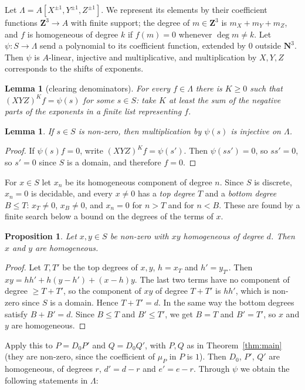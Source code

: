\documentclass[11pt]{amsart}
\newtheorem{proposition}[theorem]{Proposition}
\newtheorem{lemma}[theorem]{Lemma}
\theoremstyle{definition}
\theoremstyle{remark}
\newcommand{\La}{\Lambda}
\newcommand{\N}{\mathbf N}
\newcommand{\Z}{\mathbf Z}
\begin{document}
Let $\La=A[X^{\pm1},Y^{\pm1},Z^{\pm1}]$. We represent its elements by their
coefficient functions $\Z^3\to A$ with finite support; the degree of
$m\in\Z^3$ is $m_X+m_Y+m_Z$, and $f$ is homogeneous of degree $k$ if
$f(m)=0$ whenever $\deg m\ne k$. Let $\psi:S\to\La$ send a polynomial to its
coefficient function, extended by $0$ outside $\N^3$. Then $\psi$ is
$A$-linear, injective and multiplicative, and multiplication by $X,Y,Z$
corresponds to the shifts of exponents.

\begin{lemma}[clearing denominators]\label{lem:shift}
For every $f\in\La$ there is $K\ge0$ such that $(XYZ)^Kf=\psi(s)$ for some
$s\in S$: take $K$ at least the sum of the negative parts of the exponents
in a finite list representing $f$.
\end{lemma}

\begin{lemma}\label{lem:reg}
If $s\in S$ is non-zero, then multiplication by $\psi(s)$ is injective on
$\La$.
\end{lemma}
\begin{proof}
If $\psi(s)f=0$, write $(XYZ)^Kf=\psi(s')$. Then $\psi(ss')=0$, so $ss'=0$,
so $s'=0$ since $S$ is a domain, and therefore $f=0$.
\end{proof}

For $x\in S$ let $x_n$ be its homogeneous component of degree $n$. Since $S$
is discrete, $x_n=0$ is decidable, and every $x\ne0$ has a \emph{top degree}
$T$ and a \emph{bottom degree} $B\le T$: $x_T\ne0$, $x_B\ne0$, and
$x_n=0$ for $n>T$ and for $n<B$. These are found by a finite search below a
bound on the degrees of the terms of $x$.

\begin{proposition}\label{prop:homdiv}
Let $x,y\in S$ be non-zero with $xy$ homogeneous of degree $d$. Then $x$
and $y$ are homogeneous.
\end{proposition}
\begin{proof}
Let $T,T'$ be the top degrees of $x,y$, $h=x_T$ and $h'=y_{T'}$. Then
$xy=hh'+h(y-h')+(x-h)y$. The last two terms have no component of degree
$\ge T+T'$, so the component of $xy$ of degree $T+T'$ is $hh'$, which is
non-zero since $S$ is a domain. Hence $T+T'=d$. In the same way the bottom
degrees satisfy $B+B'=d$. Since $B\le T$ and $B'\le T'$, we get $B=T$ and
$B'=T'$, so $x$ and $y$ are homogeneous.
\end{proof}

Apply this to $P=D_0P'$ and $Q=D_0Q'$, with $P,Q$ as in
Theorem~\ref{thm:main} (they are non-zero, since the coefficient of
$\mu_P$ in $P$ is $1$). Then $D_0$, $P'$, $Q'$ are homogeneous, of degrees
$r$, $d'=d-r$ and $e'=e-r$. Through $\psi$ we obtain the following
statements in $\La$:
\end{document}
